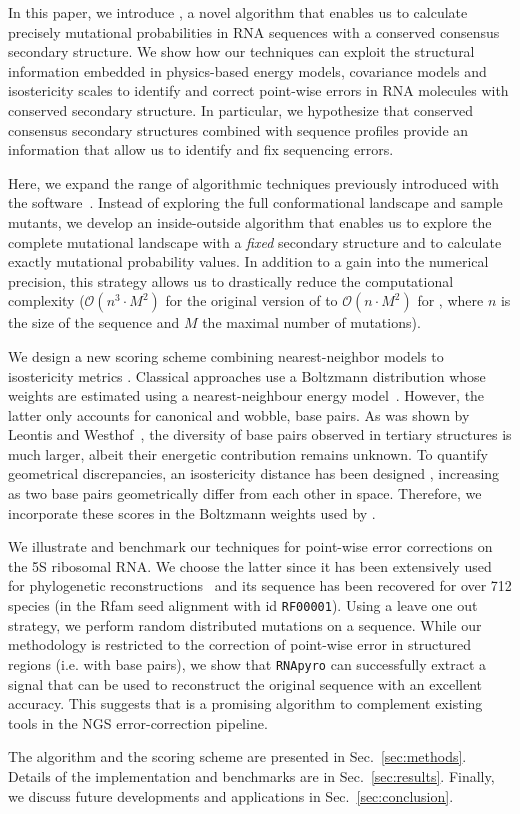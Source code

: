 In this paper, we introduce \RNApyro, a novel algorithm that enables us to calculate precisely mutational probabilities in RNA sequences with a
conserved consensus secondary structure. We show how our techniques can exploit the structural information embedded in physics-based energy models, 
covariance models and isostericity scales to identify and correct point-wise errors in RNA molecules with conserved secondary structure. In particular, we 
hypothesize that  conserved consensus secondary structures combined with sequence profiles  provide an information that allow us to identify and fix sequencing errors.

Here, we expand the range of algorithmic techniques previously introduced with the \RNAmutants software~\citep{Waldispuhl2008,Waldispuhl2011}.
Instead of exploring the full conformational landscape and sample mutants, we develop an inside-outside algorithm that enables us
to explore the complete mutational landscape with a \emph{fixed} secondary structure and to calculate exactly mutational probability values. In addition
to a gain into the numerical precision, this strategy allows us to drastically reduce the computational complexity ($\mathcal{O}(n^3 \cdot M^2)$ for the
original version of  \RNAmutants to $\mathcal{O}(n \cdot M^2)$ for \RNApyro, where $n$ is the size of the sequence and $M$ the maximal number of mutations).

We design a new scoring scheme combining nearest-neighbor models \citep{Turner2010} to isostericity metrics \citep{Stombaugh2009}.
Classical approaches use a Boltzmann distribution whose weights are estimated using a nearest-neighbour energy model~\citep{Turner2010}. However, the
latter only accounts for  canonical and wobble, base pairs. As was shown by Leontis and Westhof~\citep{Leontis2001},
the diversity of base pairs observed in tertiary structures is much larger, albeit their energetic contribution remains unknown. To quantify geometrical discrepancies, 
an isostericity distance has been designed \citep{Stombaugh2009}, increasing as two base pairs geometrically differ from each other in space. Therefore, we 
incorporate these scores in the Boltzmann weights used by \RNApyro.
 
We illustrate and benchmark our techniques for point-wise error corrections on the 5S ribosomal RNA. We choose the latter since it has been extensively
used for phylogenetic reconstructions~\citep{Hori1987} and its sequence has been recovered for over 712 species (in the Rfam seed alignment with id
\texttt{RF00001}). Using a leave one out strategy, we perform random distributed mutations on a sequence. While our methodology is restricted to the correction of 
point-wise error in structured regions (i.e. with base pairs), we show that \texttt{RNApyro} can successfully extract a signal that can be used to reconstruct the 
original sequence with an excellent accuracy. This suggests that \RNApyro is a promising algorithm to complement existing tools in the NGS error-correction 
pipeline.

The algorithm and the scoring scheme are presented in Sec.~\ref{sec:methods}. Details of the implementation and benchmarks are in Sec.~\ref{sec:results}. 
Finally, we discuss future developments and applications in Sec.~\ref{sec:conclusion}.